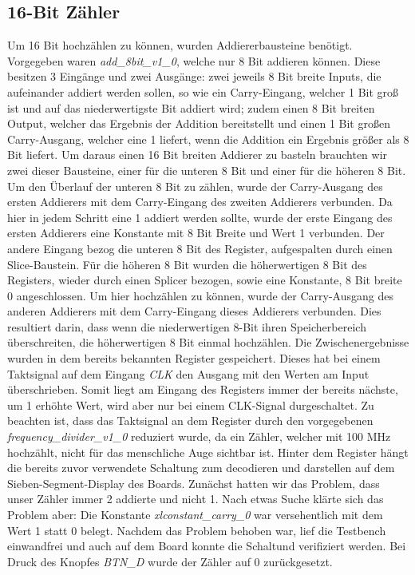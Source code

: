 \documentclass[11pt, a4paper]{article}
\begin{document}
\subsection*{16-Bit Zähler}
Um 16 Bit hochzählen zu können, wurden Addiererbausteine benötigt.
Vorgegeben waren \textit{add\_8bit\_v1\_0}, welche nur 8 Bit addieren können. 
Diese besitzen 3 Eingänge und zwei Ausgänge: zwei jeweils 8 Bit breite Inputs, die aufeinander addiert werden sollen, so wie ein Carry-Eingang, welcher 1 Bit groß ist und auf das niederwertigste Bit addiert wird; zudem einen 8 Bit breiten Output, welcher das Ergebnis der Addition bereitstellt und einen 1 Bit großen Carry-Ausgang, welcher eine 1 liefert, wenn die Addition ein Ergebnis größer als 8 Bit liefert.
\newline
Um daraus einen 16 Bit breiten Addierer zu basteln brauchten wir zwei dieser Bausteine, einer für die unteren 8 Bit und einer für die höheren 8 Bit.
Um den Überlauf der unteren 8 Bit zu zählen, wurde der Carry-Ausgang des ersten Addierers mit dem Carry-Eingang des zweiten Addierers verbunden.
Da hier in jedem Schritt eine 1 addiert werden sollte, wurde der erste Eingang des ersten Addierers eine Konstante mit 8 Bit Breite und Wert 1 verbunden.
Der andere Eingang bezog die unteren 8 Bit des Register, aufgespalten durch einen Slice-Baustein.
\newline
Für die höheren 8 Bit wurden die höherwertigen 8 Bit des Registers, wieder durch einen Splicer bezogen, sowie eine Konstante, 8 Bit breite 0 angeschlossen.
Um hier hochzählen zu können, wurde der Carry-Ausgang des anderen Addierers mit dem Carry-Eingang dieses Addierers verbunden.
Dies resultiert darin, dass wenn die niederwertigen 8-Bit ihren Speicherbereich überschreiten, die höherwertigen 8 Bit einmal hochzählen.
\newline
Die Zwischenergebnisse wurden in dem bereits bekannten Register gespeichert. Dieses hat bei einem Taktsignal auf dem Eingang \textit{CLK} den Ausgang mit den Werten am Input überschrieben. Somit liegt am Eingang des Registers immer der bereits nächste, um 1 erhöhte Wert, wird aber nur bei einem CLK-Signal durgeschaltet.
Zu beachten ist, dass das Taktsignal an dem Register durch den vorgegebenen \textit{frequency\_divider\_v1\_0} reduziert wurde, da ein Zähler, welcher mit 100 MHz hochzählt, nicht für das menschliche Auge sichtbar ist.
\newline
Hinter dem Register hängt die bereits zuvor verwendete Schaltung zum decodieren und darstellen auf dem Sieben-Segment-Display des Boards.
\newline
Zunächst hatten wir das Problem, dass unser Zähler immer 2 addierte und nicht 1. Nach etwas Suche klärte sich das Problem aber: Die Konstante \textit{xlconstant\_carry\_0} war versehentlich mit dem Wert 1 statt 0 belegt.
Nachdem das Problem behoben war, lief die Testbench einwandfrei und auch auf dem Board konnte die Schaltund verifiziert werden. Bei Druck des Knopfes \textit{BTN\_D} wurde der Zähler auf 0 zurückgesetzt.
\end{document}
